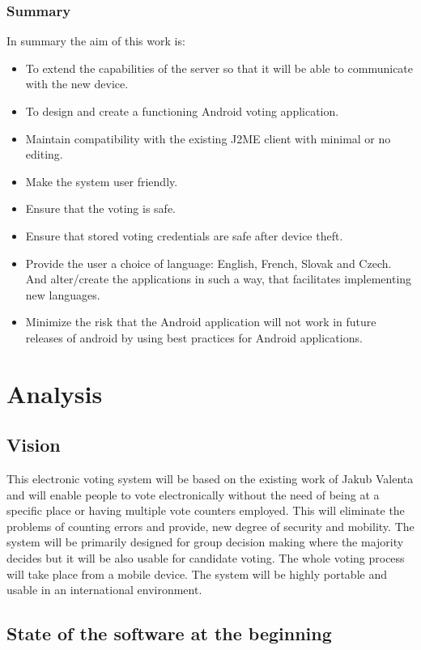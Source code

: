 \documentclass[11pt,twoside,a4paper]{book}
\begin{document}
\subsection{Summary}
In summary the aim of this work is:

\begin{itemize}
\item To extend the capabilities of the server so that it will be able to communicate with the new device.
\item To design and create a functioning Android voting application.
\item Maintain compatibility with the existing J2ME client with minimal or no editing.
\item Make the system user friendly.
\item Ensure that the voting is safe.
\item Ensure that stored voting credentials are safe after device theft.
\item Provide the user a choice of language: English, French, Slovak and Czech. And alter/create the applications in such a way, that facilitates implementing new languages.
\item Minimize the risk that the Android application will not work in future releases of android by using best practices for Android applications.
\end{itemize}
\chapter{Analysis}
\section{Vision}
This electronic voting system will be based on the existing work of Jakub Valenta \cite{bakalarkaJV} and will enable people to vote electronically without the need of being at a specific place or having multiple vote counters employed. This will eliminate the problems of counting errors and provide, new degree of security and mobility. The system will be primarily designed for group decision making where the majority decides but it will be also usable for candidate voting. The whole voting process will take place from a mobile device. The system will be highly portable and usable in an international environment.
\section{State of the software at the beginning}
\end{document}
